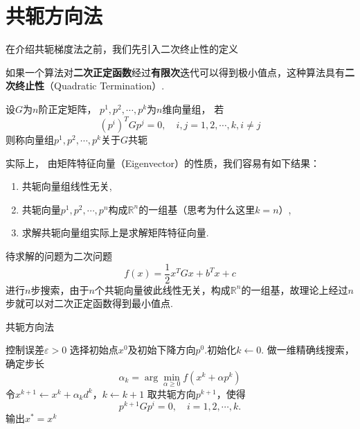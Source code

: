 \section{共轭方向法}
在介绍共轭梯度法之前，我们先引入二次终止性的定义
\begin{definition}
	如果一个算法对\textbf{二次正定函数}经过\textbf{有限次}迭代可以得到极小值点，这种算法具有\textbf{二次终止性}（Quadratic Termination）.
\end{definition}
\begin{definition}[共轭向量]
	设$G$为$n$阶正定矩阵， $p^1, p^2,\cdots ,p^k$为$n$维向量组， 若
	\begin{equation*}
		{(p^i)}^TGp^j = 0,\quad i, j = 1,2,\cdots, k, i\neq j
	\end{equation*}
	则称向量组$p^1, p^2,\cdots ,p^k$关于$G$共轭
\end{definition}
\begin{note}
	实际上， 由矩阵特征向量（Eigenvector）的性质，我们容易有如下结果：
	\begin{enumerate}
		\item 共轭向量组线性无关,
		\item 共轭向量$p^1, p^2, \cdots, p^n$构成$\mathbb{R}^n$的一组基（思考为什么这里$k=n$）,
		\item 求解共轭向量组实际上是求解矩阵特征向量.
	\end{enumerate}
\end{note}
待求解的问题为二次问题
\begin{equation}
	f(x) = \frac{1}{2}x^TGx+b^Tx+c
\end{equation}
进行$n$步搜索，由于$n$个共轭向量彼此线性无关，构成$\mathbb{R}^n$的一组基，故理论上经过$n$步就可以对二次正定函数得到最小值点.
\begin{algorithm}[H]
\caption{共轭方向法}%
\begin{algorithmic}[1]%
\Require 控制误差$\varepsilon > 0$
\State 选择初始点$x^0$及初始下降方向$p^0$.初始化$k \leftarrow 0$.
\State 做一维精确线搜索，确定步长
\begin{equation*}
	\alpha_k = \arg\min\limits_{\alpha \geq 0} f(x^k+\alpha p^k)
\end{equation*}
\State 令$x^{k+1}\leftarrow x^k + \alpha_k d^k$，$k\leftarrow k+1$
\State 取共轭方向$p^{k+1}$，使得
\begin{equation*}
	p^{k+1}Gp^i = 0,\quad i = 1, 2, \cdots, k.
\end{equation*}
\EndWhile
\State 输出$x^* = x^k$
\end{algorithmic}  
\end{algorithm}

